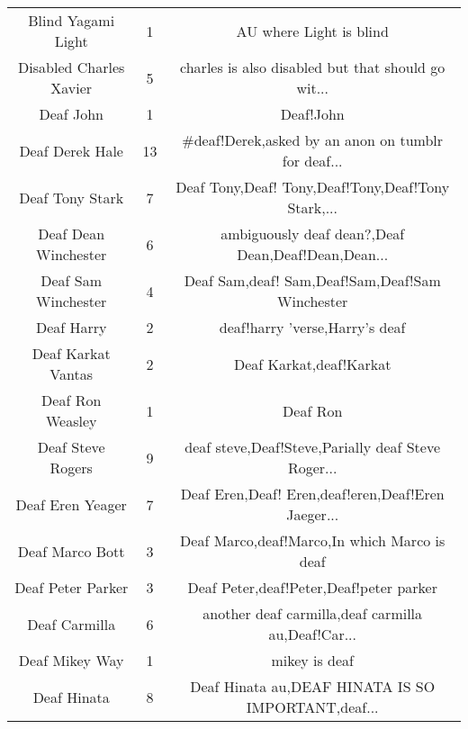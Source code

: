 \begin{table}[h!]
{\begin{tabular}{|c|c|c|}
                                Blind Yagami Light &      1 &                            AU where Light is blind \\
                           Disabled Charles Xavier &      5 & charles is also disabled but that should go wit... \\
                                         Deaf John &      1 &                                          Deaf!John \\
                                   Deaf Derek Hale &     13 & \#deaf!Derek,asked by an anon on tumblr for deaf... \\
                                   Deaf Tony Stark &      7 & Deaf Tony,Deaf! Tony,Deaf!Tony,Deaf!Tony Stark,... \\
                              Deaf Dean Winchester &      6 & ambiguously deaf dean?,Deaf Dean,Deaf!Dean,Dean... \\
                               Deaf Sam Winchester &      4 &    Deaf Sam,deaf! Sam,Deaf!Sam,Deaf!Sam Winchester \\
                                        Deaf Harry &      2 &                     deaf!harry 'verse,Harry's deaf \\
                                Deaf Karkat Vantas &      2 &                            Deaf Karkat,deaf!Karkat \\
                                  Deaf Ron Weasley &      1 &                                           Deaf Ron \\
                                 Deaf Steve Rogers &      9 & deaf steve,Deaf!Steve,Parially deaf Steve Roger... \\
                                  Deaf Eren Yeager &      7 & Deaf Eren,Deaf! Eren,deaf!eren,Deaf!Eren Jaeger... \\
                                   Deaf Marco Bott &      3 &       Deaf Marco,deaf!Marco,In which Marco is deaf \\
                                 Deaf Peter Parker &      3 &            Deaf Peter,deaf!Peter,Deaf!peter parker \\
                                     Deaf Carmilla &      6 & another deaf carmilla,deaf carmilla au,Deaf!Car... \\
                                    Deaf Mikey Way &      1 &                                      mikey is deaf \\
                                       Deaf Hinata &      8 & Deaf Hinata au,DEAF HINATA IS SO IMPORTANT,deaf... \\

\end{tabular}}
\end{table}
